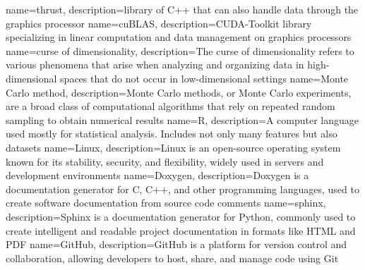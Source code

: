 {
    name=\textnormal{thrust},
    description={library of C++ that can also handle data through the graphics processor}
}
{
    name=\textnormal{cuBLAS},
    description={CUDA-Toolkit library specializing in linear computation and data management on graphics processors}
}
{
name=\textnormal{curse of dimensionality},
description={The curse of dimensionality refers to various phenomena that arise when analyzing and organizing data in high-dimensional spaces that do not occur in low-dimensional settings}
}
{
	name=\textnormal{Monte Carlo method},
	description={Monte Carlo methods, or Monte Carlo experiments, are a broad class of computational algorithms that rely on repeated random sampling to obtain numerical results}
}
{
name=\textnormal{R},
description={A computer language used mostly for statistical analysis. Includes not only many features but also datasets}
}
{
name=\textnormal{Linux},
description={Linux is an open-source operating system known for its stability, security, and flexibility, widely used in servers and development environments}
}
{
name=\textnormal{Doxygen},
description={Doxygen is a documentation generator for C, C++, and other programming languages, used to create software documentation from source code comments}
}
{
name=\textnormal{sphinx},
description={Sphinx is a documentation generator for Python, commonly used to create intelligent and readable project documentation in formats like HTML and PDF}
}
{
name=\textnormal{GitHub},
description={GitHub is a platform for version control and collaboration, allowing developers to host, share, and manage code using Git}
}





